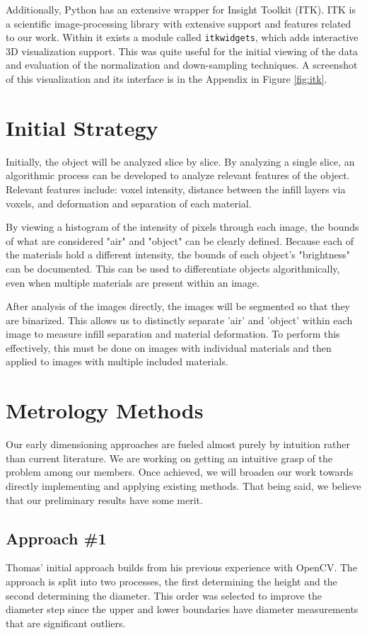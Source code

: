 \documentclass[11pt, letterpaper, notitlepage]{article}
\begin{document}
\begin{multicols}{2}
Additionally, Python has an extensive wrapper for Insight Toolkit (ITK)\cite{mccormick_itk_2014}. ITK is a scientific image-processing library with extensive support and features related to our work. Within it exists a module called \verb|itkwidgets|, which adds interactive 3D visualization support. This was quite useful for the initial viewing of the data and evaluation of the normalization and down-sampling techniques. A screenshot of this visualization and its interface is in the Appendix in Figure \ref{fig:itk}.

\section{Initial Strategy}
Initially, the object will be analyzed slice by slice. By analyzing a single slice, an algorithmic process can be developed to analyze relevant features of the object. Relevant features include: voxel intensity, distance between the infill layers via voxels, and deformation and separation of each material. 

By viewing a histogram of the intensity of pixels through each image, the bounds of what are considered "air" and "object" can be clearly defined. Because each of the materials hold a different intensity, the bounds of each object's "brightness" can be documented. This can be used to differentiate objects algorithmically, even when multiple materials are present within an image. 

After analysis of the images directly, the images will be segmented so that they are binarized. This allows us to distinctly separate 'air' and 'object' within each image to measure infill separation and material deformation. To perform this effectively, this must be done on images with individual materials and then applied to images with multiple included materials. 

\section{Metrology Methods}
Our early dimensioning approaches are fueled almost purely by intuition rather than current literature. We are working on getting an intuitive grasp of the problem among our members. Once achieved, we will broaden our work towards directly implementing and applying existing methods. That being said, we believe that our preliminary results have some merit.

\subsection{Approach \#1}
Thomas' initial approach builds from his previous experience with OpenCV\cite{opencv_library}. The approach is split into two processes, the first determining the height and the second determining the diameter. This order was selected to improve the diameter step since the upper and lower boundaries have diameter measurements that are significant outliers.


\end{multicols}
\end{document}
